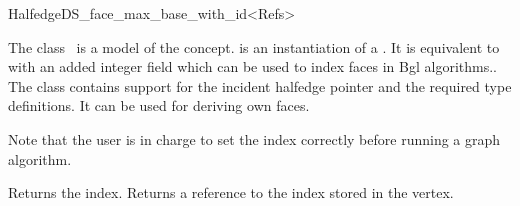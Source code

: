 
\ccRefPageBegin



\begin{ccRefClass}{HalfedgeDS_face_max_base_with_id<Refs>}
  
The class \ccRefName\ is a model of the 
concept.  is an instantiation of a .  It is
equivalent to 
with an added integer field which can be used to index faces
in {\sc Bgl} algorithms.. 
The class contains support for the incident halfedge pointer
and the required type definitions.
It can be used for deriving own faces.

Note that the user is in charge to set the index correctly before
running a graph algorithm.


\ccIsModel


\ccCreation
{}


{Returns the index.}
\ccGlue
{}
{Returns a reference to the index stored in the vertex.}

\ccSeeAlso

\\
\\
\\
\\
\\
\\

\end{ccRefClass}

\ccRefPageEnd

